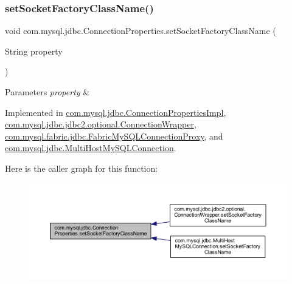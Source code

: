 \subsubsection{\texorpdfstring{set\+Socket\+Factory\+Class\+Name()}{setSocketFactoryClassName()}}
{\footnotesize\ttfamily void com.\+mysql.\+jdbc.\+Connection\+Properties.\+set\+Socket\+Factory\+Class\+Name (\begin{DoxyParamCaption}\item[{String}]{property }\end{DoxyParamCaption})}


\begin{DoxyParams}{Parameters}
{\em property} & \\
\hline
\end{DoxyParams}


Implemented in \mbox{\hyperlink{classcom_1_1mysql_1_1jdbc_1_1_connection_properties_impl_ad6b6ec74d81a6683a56f915860a465ed}{com.\+mysql.\+jdbc.\+Connection\+Properties\+Impl}}, \mbox{\hyperlink{classcom_1_1mysql_1_1jdbc_1_1jdbc2_1_1optional_1_1_connection_wrapper_a7a51e27bd16ff0326a017cb9efe65e53}{com.\+mysql.\+jdbc.\+jdbc2.\+optional.\+Connection\+Wrapper}}, \mbox{\hyperlink{classcom_1_1mysql_1_1fabric_1_1jdbc_1_1_fabric_my_s_q_l_connection_proxy_ab4b921704edd8b9a8fcc0a762eb14f80}{com.\+mysql.\+fabric.\+jdbc.\+Fabric\+My\+S\+Q\+L\+Connection\+Proxy}}, and \mbox{\hyperlink{classcom_1_1mysql_1_1jdbc_1_1_multi_host_my_s_q_l_connection_a24d505e2b23813fa2186aae41633b5de}{com.\+mysql.\+jdbc.\+Multi\+Host\+My\+S\+Q\+L\+Connection}}.

Here is the caller graph for this function\+:\nopagebreak
\begin{figure}[H]
\begin{center}
\leavevmode
\includegraphics[width=350pt]{interfacecom_1_1mysql_1_1jdbc_1_1_connection_properties_ab0f719c12e2d1fe7fe6dd180e8c7a825_icgraph}
\end{center}
\end{figure}
\mbox{\label{interfacecom_1_1mysql_1_1jdbc_1_1_connection_properties_a9c60457be4c5136f4c9a46d849b4a5b9}} 
